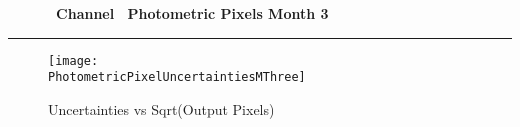 
\cleardoublepage
\begin{figure*}[h!]
  \centering
  \hfill
  {\Huge {\bf \quarter\ Channel \channel\ Photometric Pixels Month 3}}
  \hfill
\end{figure*}
\hrule

\begin{figure*}[h!]
  \centering
  \texttt{[image: \\PhotometricPixelUncertaintiesMThree]}
  \caption{Uncertainties vs Sqrt(Output Pixels)}
\end{figure*}


